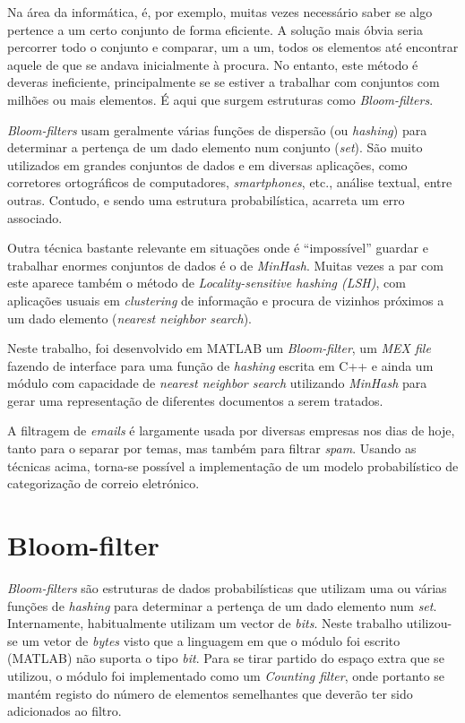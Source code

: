 \documentclass[a4paper,11pt,openright,oneside]{report}
\begin{document}
Na área da informática, é, por exemplo, muitas vezes necessário saber se algo pertence a um certo conjunto de forma eficiente. A solução mais óbvia seria percorrer todo o conjunto e comparar, um a um, todos os elementos até encontrar aquele de que se andava inicialmente à procura. No entanto, este método é deveras ineficiente, principalmente se se estiver a trabalhar com conjuntos com milhões ou mais elementos. É aqui que surgem estruturas como \textit{Bloom-filters}. 

\textit{Bloom-filters} usam geralmente várias funções de dispersão (ou \textit{hashing}) para determinar a pertença de um dado elemento num conjunto (\textit{set}). São muito utilizados em grandes conjuntos de dados e em diversas aplicações, como corretores ortográficos de computadores, \textit{smartphones}, etc., análise textual, entre outras. Contudo, e sendo uma estrutura probabilística, acarreta um erro associado.

Outra técnica bastante relevante em situações onde é ``impossível'' guardar e trabalhar enormes conjuntos de dados é o de \textit{MinHash}. Muitas vezes a par com este aparece também o método de \textit{Locality-sensitive hashing (LSH)}, com aplicações usuais em \textit{clustering} de informação e procura de vizinhos próximos a um dado elemento (\textit{nearest neighbor search}).

Neste trabalho, foi desenvolvido em MATLAB um \textit{Bloom-filter}, um \textit{MEX file} fazendo de interface para uma função de \textit{hashing} escrita em C++ e ainda um módulo com capacidade de \textit{nearest neighbor search} utilizando \textit{MinHash} para gerar uma representação de diferentes documentos a serem tratados.

A filtragem de \textit{emails} é largamente usada por diversas empresas nos dias de hoje, tanto para o separar por temas, mas também para filtrar \textit{spam}. Usando as técnicas acima, torna-se possível a implementação de um modelo probabilístico de categorização de correio eletrónico.

\chapter{Bloom-filter}
\label{chap.bloom}

\textit{Bloom-filters} são estruturas de dados probabilísticas que utilizam uma ou várias funções de \textit{hashing} para determinar a pertença de um dado elemento num \textit{set}. Internamente, habitualmente utilizam um vector de \textit{bits}. Neste trabalho utilizou-se um vetor de \textit{bytes} visto que a linguagem em que o módulo foi escrito (MATLAB) não suporta o tipo \textit{bit}. Para se tirar partido do espaço extra que se utilizou, o módulo foi implementado como um \textit{Counting filter}, onde portanto se mantém registo do número de elementos semelhantes que deverão ter sido adicionados ao filtro.
\end{document}
